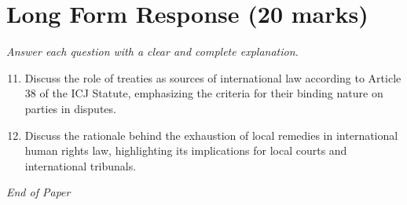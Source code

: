\documentclass[12pt]{article}
\begin{document}
\section*{Long Form Response (20 marks)}
\textit{Answer each question with a clear and complete explanation.}
\begin{enumerate}[label=\arabic*.]
\setcounter{enumi}{10}
\item Discuss the role of treaties as sources of international law according to Article 38 of the ICJ Statute, emphasizing the criteria for their binding nature on parties in disputes.
\item Discuss the rationale behind the exhaustion of local remedies in international human rights law, highlighting its implications for local courts and international tribunals.
\end{enumerate}

\vfill
\noindent\textit{End of Paper}
\end{document}
